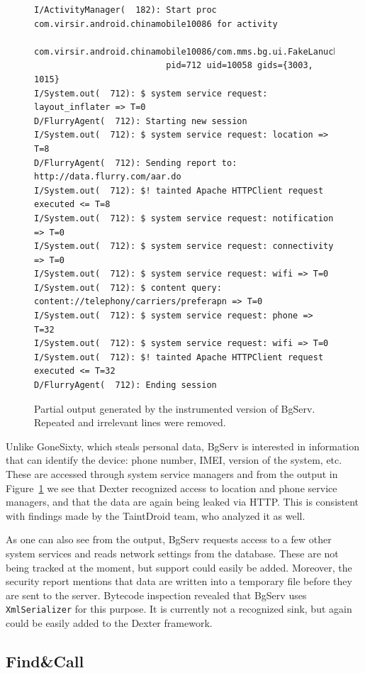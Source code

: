 \documentclass[12pt,twoside,notitlepage]{report}
\begin{document}
\begin{figure}[t]
	\scriptsize
	\begin{verbatim}
I/ActivityManager(  182): Start proc com.virsir.android.chinamobile10086 for activity 
                          com.virsir.android.chinamobile10086/com.mms.bg.ui.FakeLanucherActivity: 
                          pid=712 uid=10058 gids={3003, 1015}
I/System.out(  712): $ system service request: layout_inflater => T=0
D/FlurryAgent(  712): Starting new session
I/System.out(  712): $ system service request: location => T=8
D/FlurryAgent(  712): Sending report to: http://data.flurry.com/aar.do
I/System.out(  712): $! tainted Apache HTTPClient request executed <= T=8
I/System.out(  712): $ system service request: notification => T=0
I/System.out(  712): $ system service request: connectivity => T=0
I/System.out(  712): $ system service request: wifi => T=0
I/System.out(  712): $ content query: content://telephony/carriers/preferapn => T=0
I/System.out(  712): $ system service request: phone => T=32
I/System.out(  712): $ system service request: wifi => T=0
I/System.out(  712): $! tainted Apache HTTPClient request executed <= T=32
D/FlurryAgent(  712): Ending session
	\end{verbatim}
	\caption{Partial output generated by the instrumented version of BgServ. Repeated and irrelevant lines were removed.}
	\label{figure:Evaluation_BgServ}
\end{figure}

Unlike GoneSixty, which steals personal data, BgServ is interested in information that can identify the device: phone number, IMEI, version of the system, etc. These are accessed through system service managers and from the output in Figure~\ref{figure:Evaluation_BgServ} we see that Dexter recognized access to location and phone service managers, and that the data are again being leaked via HTTP. This is consistent with findings made by the TaintDroid team, who analyzed it as well.

As one can also see from the output, BgServ requests access to a few other system services and reads network settings from the database. These are not being tracked at the moment, but support could easily be added. Moreover, the security report mentions that data are written into a temporary file before they are sent to the server. Bytecode inspection revealed that BgServ uses \verb$XmlSerializer$ for this purpose. It is currently not a recognized sink, but again could be easily added to the Dexter framework.

\subsection{Find\&Call}
\end{document}
